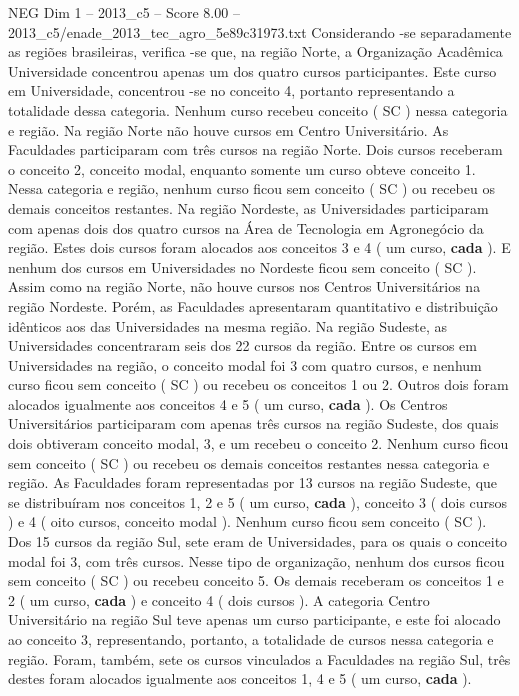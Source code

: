 \begin{textsample}{NEG Dim 1 – 2013\_c5 – Score 8.00 – 2013\_c5/enade\_2013\_tec\_agro\_5e89c31973.txt}
Considerando -se separadamente as regiões brasileiras, verifica -se que, na região Norte, a Organização Acadêmica Universidade concentrou apenas um dos quatro cursos participantes.
Este curso em Universidade, concentrou -se no conceito 4, portanto representando a totalidade dessa categoria.
Nenhum curso recebeu conceito ( SC ) nessa categoria e região.
Na região Norte não houve cursos em Centro Universitário.
As Faculdades participaram com três cursos na região Norte.
Dois cursos receberam o conceito 2, conceito modal, enquanto somente um curso obteve conceito 1.
Nessa categoria e região, nenhum curso ficou sem conceito ( SC ) ou recebeu os demais conceitos restantes.
Na região Nordeste, as Universidades participaram com apenas dois dos quatro cursos na Área de Tecnologia em Agronegócio da região.
Estes dois cursos foram alocados aos conceitos 3 e 4 ( um curso, \textbf{cada} ).
E nenhum dos cursos em Universidades no Nordeste ficou sem conceito ( SC ).
Assim como na região Norte, não houve cursos nos Centros Universitários na região Nordeste.
Porém, as Faculdades apresentaram quantitativo e distribuição idênticos aos das Universidades na mesma região.
Na região Sudeste, as Universidades concentraram seis dos 22 cursos da região.
Entre os cursos em Universidades na região, o conceito modal foi 3 com quatro cursos, e nenhum curso ficou sem conceito ( SC ) ou recebeu os conceitos 1 ou 2.
Outros dois foram alocados igualmente aos conceitos 4 e 5 ( um curso, \textbf{cada} ).
Os Centros Universitários participaram com apenas três cursos na região Sudeste, dos quais dois obtiveram conceito modal, 3, e um recebeu o conceito 2.
Nenhum curso ficou sem conceito ( SC ) ou recebeu os demais conceitos restantes nessa categoria e região.
As Faculdades foram representadas por 13 cursos na região Sudeste, que se distribuíram nos conceitos 1, 2 e 5 ( um curso, \textbf{cada} ), conceito 3 ( dois cursos ) e 4 ( oito cursos, conceito modal ).
Nenhum curso ficou sem conceito ( SC ).
Dos 15 cursos da região Sul, sete eram de Universidades, para os quais o conceito modal foi 3, com três cursos.
Nesse tipo de organização, nenhum dos cursos ficou sem conceito ( SC ) ou recebeu conceito 5.
Os demais receberam os conceitos 1 e 2 ( um curso, \textbf{cada} ) e conceito 4 ( dois cursos ).
A categoria Centro Universitário na região Sul teve apenas um curso participante, e este foi alocado ao conceito 3, representando, portanto, a totalidade de cursos nessa categoria e região.
Foram, também, sete os cursos vinculados a Faculdades na região Sul, três destes foram alocados igualmente aos conceitos 1, 4 e 5 ( um curso, \textbf{cada} ).

\end{textsample}
